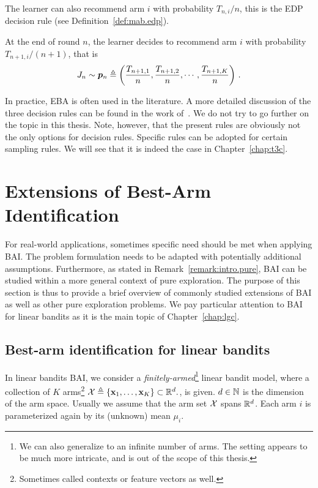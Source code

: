 The learner can also recommend arm $i$ with probability $T_{n,i}/n$, this is the EDP decision rule (see Definition~\ref{def:mab.edp}).

\begin{definition}
\begin{leftbar}[defnbar]\label{def:mab.edp}
    At the end of round $n$, the learner decides to recommend arm $i$ with probability $T_{n+1,i}/(n+1)$, that is
    \[
        J_n \sim \boldsymbol{p}_{n}\triangleq\left(\frac{T_{n+1,1}}{n},\frac{T_{n+1,2}}{n},\cdots,\frac{T_{n+1,K}}{n}\right)\,.
    \]
\end{leftbar}
\end{definition}

In practice, EBA is often used in the literature. A more detailed discussion of the three decision rules can be found in the work of~\cite{bubeck2009pure}. We do not try to go further on the topic in this thesis. Note, however, that the present rules are obviously not the only options for decision rules. Specific rules can be adopted for certain sampling rules. We will see that it is indeed the case in Chapter~\ref{chap:t3c}.

\section{Extensions of Best-Arm Identification}\label{sec:mab.extensions}

For real-world applications, sometimes specific need should be met when applying BAI. The problem formulation needs to be adapted with potentially additional assumptions. Furthermore, as stated in Remark~\ref{remark:intro.pure}, BAI can be studied within a more general context of pure exploration. The purpose of this section is thus to provide a brief overview of commonly studied extensions of BAI as well as other pure exploration problems. We pay particular attention to BAI for linear bandits as it is the main topic of Chapter~\ref{chap:lgc}.

\subsection{Best-arm identification for linear bandits}\label{sec:mab.extensions.linear}

In linear bandits BAI, we consider a \emph{finitely-armed}\footnote{We can also generalize to an infinite number of arms. The setting appears to be much more intricate, and is out of the scope of this thesis.} linear bandit model, where a collection of $K$ arms\footnote{Sometimes called contexts or feature vectors as well.} $\mathcal{X}\triangleq\{{\bf x}_1,\ldots,{\bf x}_K\}\subset \mathbb{R}^d.$, is given. $d\in{\mathbb N}$ is the dimension of the arm space. Usually we assume that the arm set $\mathcal{X}$ spans $\mathbb{R}^d$. Each arm $i$ is parameterized again by its (unknown) mean $\mu_i$. 

